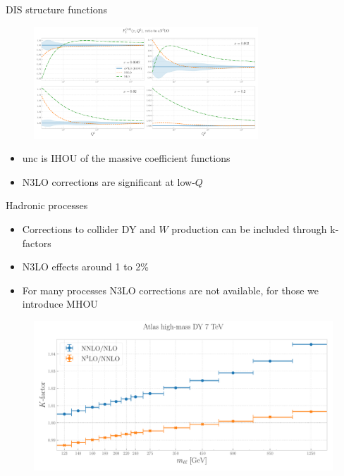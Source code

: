 \documentclass[aspectratio=169, 9pt,t]{beamer}
\begin{document}
\begin{frame}{DIS structure functions}
  \begin{figure}[!t]
    \centering
    \includegraphics[width=0.75\textwidth]{figures/F2_total.pdf}
  \end{figure}
  \begin{itemize}
    \item unc is IHOU of the massive coefficient functions
    \item N3LO corrections are significant at low-$Q$
  \end{itemize}
\end{frame}


\begin{frame}{Hadronic processes}
  \begin{itemize}
    \item Corrections to collider DY and $W$ production can be included through k-factors
    \item N3LO effects around 1 to 2\%
    \item For many processes N3LO corrections are not available, for those we introduce MHOU
  \end{itemize}
  \begin{figure}[!t]
    \centering
    \includegraphics[width=.80\textwidth]{figures/kfactor_ATLASZHIGHMASS49FB.pdf}
  \end{figure}
\end{frame}


\end{document}
